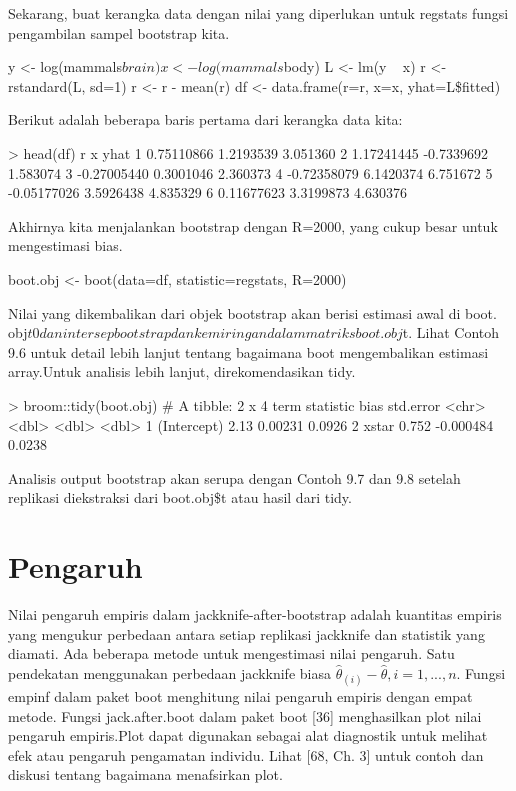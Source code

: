 \documentclass[a4paper,12pt]{article}
\theoremstyle{definition}
\begin{document}
Sekarang, buat kerangka data dengan nilai yang diperlukan untuk regstats fungsi pengambilan sampel bootstrap kita.

\begin{spverbatim}
    y <- log(mammals$brain)
    x <- log(mammals$body)
    L <- lm(y ~ x)
    r <- rstandard(L, sd=1)
    r <- r - mean(r)
    df <- data.frame(r=r, x=x, yhat=L\$fitted)
\end{spverbatim}

Berikut adalah beberapa baris pertama dari kerangka data kita:

\begin{spverbatim}
> head(df)
              r            x        yhat
1   0.75110866     1.2193539    3.051360
2   1.17241445    -0.7339692    1.583074
3  -0.27005440     0.3001046    2.360373
4  -0.72358079     6.1420374    6.751672
5  -0.05177026     3.5926438    4.835329
6   0.11677623     3.3199873    4.630376
\end{spverbatim}

Akhirnya kita menjalankan bootstrap dengan R=2000, yang cukup besar untuk mengestimasi bias.

\begin{spverbatim}
    boot.obj <- boot(data=df, statistic=regstats, R=2000)

\end{spverbatim}

Nilai yang dikembalikan dari objek bootstrap akan berisi estimasi awal di boot. obj$t0 dan intersep bootstrap dan kemiringan dalam matriks boot.obj$t. Lihat Contoh 9.6 untuk detail lebih lanjut tentang bagaimana boot mengembalikan estimasi array.Untuk analisis lebih lanjut, direkomendasikan tidy.

\begin{spverbatim}
    > broom::tidy(boot.obj)
    # A tibble: 2 x 4
      term statistic bias std.error
      <chr> <dbl> <dbl> <dbl>
    1 (Intercept) 2.13 0.00231 0.0926
    2 xstar 0.752 -0.000484 0.0238 
\end{spverbatim}

Analisis output bootstrap akan serupa dengan Contoh 9.7 dan 9.8 setelah replikasi diekstraksi dari boot.obj\$t atau hasil dari tidy.

\section{Pengaruh}
Nilai pengaruh empiris dalam jackknife-after-bootstrap adalah kuantitas empiris yang mengukur perbedaan antara setiap replikasi jackknife dan statistik yang diamati. Ada beberapa metode untuk mengestimasi nilai pengaruh. Satu pendekatan menggunakan perbedaan jackknife biasa $\widehat{\theta }_{\left ( i \right )} - \widehat{\theta }, i = 1, ... , n$. Fungsi empinf dalam paket boot menghitung nilai pengaruh empiris dengan empat metode. Fungsi jack.after.boot dalam paket boot [36] menghasilkan plot nilai pengaruh empiris.Plot dapat digunakan sebagai alat diagnostik untuk melihat efek atau pengaruh pengamatan individu. Lihat [68, Ch. 3] untuk contoh dan diskusi tentang bagaimana menafsirkan plot.
\end{document}
